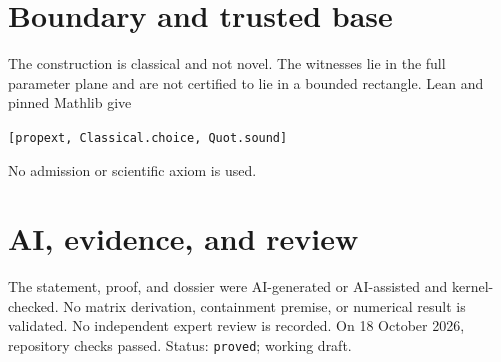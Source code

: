 \documentclass[11pt]{article}
\begin{document}
\section{Boundary and trusted base}
The construction is classical and not novel. The witnesses lie in the full parameter
plane and are not certified to lie in a bounded rectangle. Lean and pinned Mathlib give
\begin{center}\texttt{[propext, Classical.choice, Quot.sound]}\end{center}
No admission or scientific axiom is used.

\section{AI, evidence, and review}
The statement, proof, and dossier were AI-generated or AI-assisted and kernel-checked.
No matrix derivation, containment premise, or numerical result is validated. No
independent expert review is recorded. On 18 October 2026, repository checks passed.
Status: \texttt{proved}; working draft.
\end{document}
